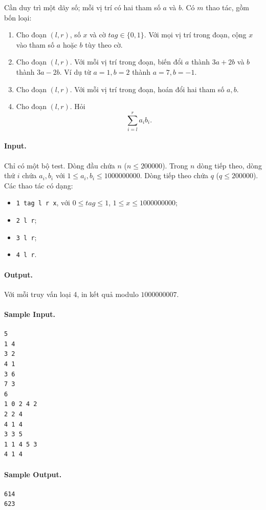 \documentclass[11pt]{article}
\begin{document}
Cần duy trì một dãy số; mỗi vị trí có hai tham số $a$ và $b$.  Có $m$ thao tác,
gồm bốn loại:
\begin{enumerate}
  \item Cho đoạn $(l,r)$, số $x$ và cờ $tag\in\{0,1\}$.  Với mọi vị trí trong
  đoạn, cộng $x$ vào tham số $a$ hoặc $b$ tùy theo cờ.
  \item Cho đoạn $(l,r)$.  Với mỗi vị trí trong đoạn, biến đổi
  $a$ thành $3a+2b$ và $b$ thành $3a-2b$.  Ví dụ từ $a=1,b=2$ thành
  $a=7,b=-1$.
  \item Cho đoạn $(l,r)$.  Với mỗi vị trí trong đoạn, hoán đổi hai tham số
  $a,b$.
  \item Cho đoạn $(l,r)$.  Hỏi
  \[
    \sum_{i=l}^{r} a_i b_i.
  \]
\end{enumerate}

\paragraph{Input.}
Chỉ có một bộ test.  Dòng đầu chứa $n$ ($n\le 200000$).  Trong $n$ dòng tiếp
theo, dòng thứ $i$ chứa $a_i,b_i$ với $1\le a_i,b_i\le 1000000000$.  Dòng tiếp
theo chứa $q$ ($q\le 200000$).  Các thao tác có dạng:
\begin{itemize}
  \item \texttt{1 tag l r x}, với $0\le tag\le 1$, $1\le x\le 1000000000$;
  \item \texttt{2 l r};
  \item \texttt{3 l r};
  \item \texttt{4 l r}.
\end{itemize}

\paragraph{Output.}
Với mỗi truy vấn loại 4, in kết quả modulo $1000000007$.

\paragraph{Sample Input.}
\begin{verbatim}
5
1 4
3 2
4 1
3 6
7 3
6
1 0 2 4 2
2 2 4
4 1 4
3 3 5
1 1 4 5 3
4 1 4
\end{verbatim}

\paragraph{Sample Output.}
\begin{verbatim}
614
623
\end{verbatim}
\end{document}
